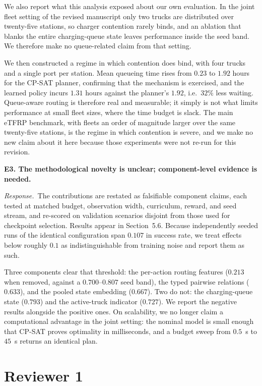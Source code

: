 \documentclass[11pt]{article}
\newcommand{\comment}[1]{\medskip\noindent\textbf{#1}\par\nopagebreak\smallskip}
\newcommand{\reply}{\noindent\textit{Response.}\ }
\begin{document}
We also report what this analysis exposed about our own evaluation. In the
joint fleet setting of the revised manuscript only two trucks are
distributed over twenty-five stations, so charger contention rarely binds, and
an ablation that blanks the entire charging-queue state leaves performance
inside the seed band. We therefore make no queue-related claim from that
setting.

We then constructed a regime in which contention does bind, with four trucks and
a single port per station. Mean queueing time rises from $0.23$ to $1.92$ hours
for the CP-SAT planner, confirming that the mechanism is exercised, and the
learned policy incurs $1.31$ hours against the planner's $1.92$, i.e.\ $32\%$
less waiting. Queue-aware routing is therefore real and measurable; it simply is
not what limits performance at small fleet sizes, where the time budget is
slack. The main eTFRP benchmark, with fleets an order of magnitude larger over
the same twenty-five stations, is the regime in which contention is severe, and
we make no new claim about it here because those experiments were not re-run for
this revision.

\comment{E3. The methodological novelty is unclear; component-level evidence is
needed.}
\reply The contributions are restated as falsifiable component claims, each
tested at matched budget, observation width, curriculum, reward, and seed
stream, and re-scored on validation scenarios disjoint from those used for
checkpoint selection. Results appear in Section~5.6. Because independently
seeded runs of the identical configuration span $0.107$ in success rate, we
treat effects below roughly $0.1$ as indistinguishable from training noise and
report them as such.

Three components clear that threshold: the per-action routing features
($0.213$ when removed, against a $0.700$--$0.807$ seed band), the typed pairwise
relations ($0.633$), and the pooled state embedding ($0.667$). Two do not: the
charging-queue state ($0.793$) and the active-truck indicator ($0.727$). We
report the negative results alongside the positive ones. On scalability, we no
longer claim a computational advantage in the joint setting: the nominal model
is small enough that CP-SAT proves optimality in milliseconds, and a budget
sweep from $0.5$~s to $45$~s returns an identical plan.

\section*{Reviewer 1}
\end{document}
